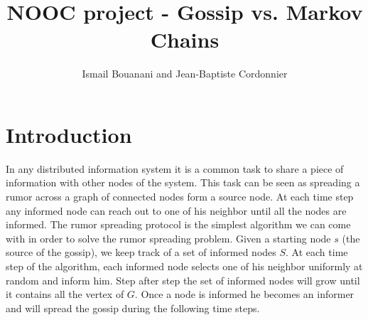 \documentclass[10pt,journal,a4paper]{IEEEtran}
\begin{document}
%
\title{NOOC project - Gossip vs. Markov Chains}
\author{Ismail Bouanani and Jean-Baptiste Cordonnier}


\newcommand{\norm}[1]{\left\lVert#1\right\rVert}
\newtheorem{theorem}{Theorem}
\newtheorem{definition}{Definition}
\renewcommand{\l}{\left}
\renewcommand{\r}{\right}
\renewcommand{\P}[1]{\mathbf{P}\l\{#1\r\}}
\newcommand{\E}[1]{\mathbf{E}\l[#1\r]}

\maketitle
\IEEEdisplaynotcompsoctitleabstractindextext

\section{Introduction}

In any distributed information system it is a common task to share a piece of information with other nodes of the system. This task can be seen as spreading a rumor across a graph of connected nodes form a source node. At each time step any informed node can reach out to one of his neighbor until all the nodes are informed. The rumor spreading protocol is the simplest algorithm we can come with in order to solve the rumor spreading problem. Given a starting node $s$ (the source of the gossip), we keep track of a set of informed nodes $S$. At each time step of the algorithm, each informed node selects one of his neighbor uniformly at random and inform him. Step after step the set of informed nodes will grow until it contains all the vertex of $G$. Once a node is informed he becomes an informer and will spread the gossip during the following time steps.
\end{document}
